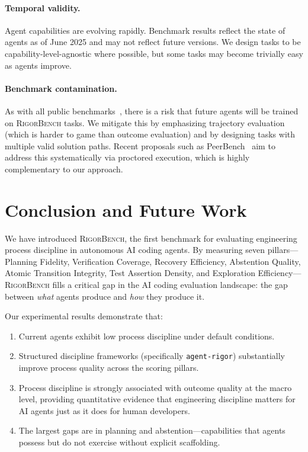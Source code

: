 \documentclass[letterpaper, 10 pt, conference]{ieeeconf}
\newcommand{\bench}{\textsc{RigorBench}}
\newcommand{\rigor}{\texttt{agent-rigor}}
\begin{document}
\paragraph{Temporal validity.}
Agent capabilities are evolving rapidly.
Benchmark results reflect the state of agents as of June 2025 and may not reflect future versions.
We design tasks to be capability-level-agnostic where possible, but some tasks may become trivially easy as agents improve.

\paragraph{Benchmark contamination.}
As with all public benchmarks~\cite{jacovi2023stop,zhang2024careful}, there is a risk that future agents will be trained on \bench{} tasks.
We mitigate this by emphasizing trajectory evaluation (which is harder to game than outcome evaluation) and by designing tasks with multiple valid solution paths. Recent proposals such as PeerBench~\cite{cheng2025peerbench} aim to address this systematically via proctored execution, which is highly complementary to our approach.



\section{Conclusion and Future Work}
\label{sec:conclusion}

We have introduced \bench{}, the first benchmark for evaluating engineering process discipline in autonomous AI coding agents.
By measuring seven pillars---Planning Fidelity, Verification Coverage, Recovery Efficiency, Abstention Quality, Atomic Transition Integrity, Test Assertion Density, and Exploration Efficiency---\bench{} fills a critical gap in the AI coding evaluation landscape: the gap between \emph{what} agents produce and \emph{how} they produce it.

Our experimental results demonstrate that:
\begin{enumerate}[leftmargin=*,itemsep=2pt]
  \item Current agents exhibit low process discipline under default conditions.
  \item Structured discipline frameworks (specifically \rigor{}) substantially improve process quality across the scoring pillars.
  \item Process discipline is strongly associated with outcome quality at the macro level, providing quantitative evidence that engineering discipline matters for AI agents just as it does for human developers.
  \item The largest gaps are in planning and abstention---capabilities that agents possess but do not exercise without explicit scaffolding.
\end{enumerate}
\end{document}
